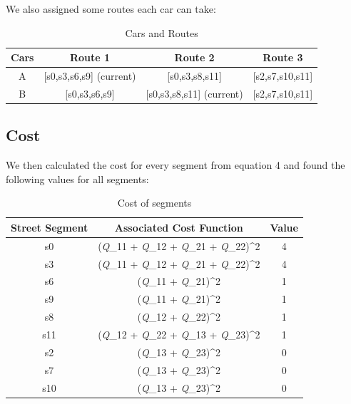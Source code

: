 \documentclass[conference]{IEEEtran}
\begin{document}
We also assigned some routes each car can take:
\begin{table}[H]
\renewcommand{\arraystretch}{1.3}
\caption{Cars and Routes}
\label{Cars and Routes}
\centering
\begin{tabular}{c|c|c|c}
    \hline
    Cars  &  Route 1  &  Route 2  &  Route 3\\
    \hline
    \hline

    A  &  [s0,s3,s6,s9] (current)  &  [s0,s3,s8,s11]  &  [s2,s7,s10,s11]\\
    \hline

    B  &  [s0,s3,s6,s9]  &  [s0,s3,s8,s11] (current)  &  [s2,s7,s10,s11]\\
    \hline
\end{tabular}
\end{table}

\subsection{Cost}

We then calculated the cost for every segment from equation 4 and found the following values for all segments:

\begin{table}[H]
\renewcommand{\arraystretch}{1.3}
\caption{Cost of segments}
\label{Cost of segments}
\centering
\begin{tabular}{c|c|c}
    \hline
    Street Segment  &  Associated Cost Function  &  Value\\
    \hline
    \hline

    s0  &   (\textit{Q}_{11} + \textit{Q}_{12} + \textit{Q}_{21} + \textit{Q}_{22})^2  &  4\\
    \hline

    s3  &  (\textit{Q}_{11} + \textit{Q}_{12} + \textit{Q}_{21} + \textit{Q}_{22})^2  &  4\\
    \hline
    
    s6  &  (\textit{Q}_{11} + \textit{Q}_{21})^2  &  1\\
    \hline
    
    s9  &  (\textit{Q}_{11} + \textit{Q}_{21})^2  &  1\\
    \hline
    
    s8  &  (\textit{Q}_{12} + \textit{Q}_{22})^2  &  1\\
    \hline
    
    s11  &  (\textit{Q}_{12} + \textit{Q}_{22} + \textit{Q}_{13} + \textit{Q}_{23})^2  &  1\\
    \hline
    
    s2  &  (\textit{Q}_{13} + \textit{Q}_{23})^2  &  0\\
    \hline
    
    s7  &  (\textit{Q}_{13} + \textit{Q}_{23})^2  &  0\\
    \hline
    
    s10  &  (\textit{Q}_{13} + \textit{Q}_{23})^2  &  0\\
    \hline
\end{tabular}
\end{table}
\end{document}
